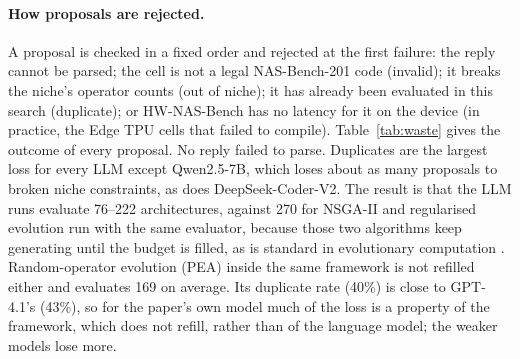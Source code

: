 \documentclass[11pt,a4paper]{article}
\begin{document}
\paragraph{How proposals are rejected.} A proposal is checked in a fixed order and rejected at the first failure: the reply cannot be parsed; the cell is not a legal NAS-Bench-201 code (invalid); it breaks the niche's operator counts (out of niche); it has already been evaluated in this search (duplicate); or HW-NAS-Bench has no latency for it on the device (in practice, the Edge TPU cells that failed to compile). Table~\ref{tab:waste} gives the outcome of every proposal. No reply failed to parse. Duplicates are the largest loss for every LLM except Qwen2.5-7B, which loses about as many proposals to broken niche constraints, as does DeepSeek-Coder-V2. The result is that the LLM runs evaluate 76--222 architectures, against 270 for NSGA-II \cite{deb02} and regularised evolution \cite{real19} run with the same evaluator, because those two algorithms keep generating until the budget is filled, as is standard in evolutionary computation \cite{mauldin84}. Random-operator evolution (PEA) inside the same framework is not refilled either and evaluates 169 on average. Its duplicate rate (40\%) is close to GPT-4.1's (43\%), so for the paper's own model much of the loss is a property of the framework, which does not refill, rather than of the language model; the weaker models lose more.
\end{document}
